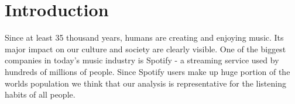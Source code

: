 \section{Introduction}
Since at least 35 thousand years, humans are creating and enjoying music. Its major impact on our culture and society are clearly visible. One of the biggest companies in today's music industry is Spotify - a streaming service used by hundreds of millions of people. Since Spotify users make up huge portion of the worlds population we think that our analysis is representative for the listening habits of all people.